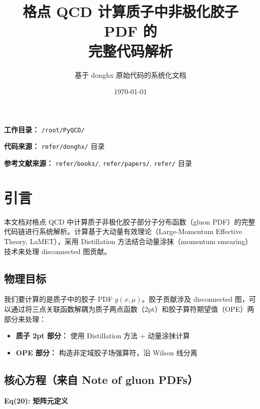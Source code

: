 \documentclass[12pt,a4paper]{ctexart}
\title{\textbf{格点 QCD 计算质子中非极化胶子 PDF 的\\完整代码解析}}
\author{基于 donghx 原始代码的系统化文档}
\date{\today}
\newcommand{\lamet}{LaMET}
\begin{document}
\maketitle
\thispagestyle{empty}

\vspace{2cm}
\begin{center}
\large
\textbf{工作目录：} \texttt{/root/PyQCD/}

\vspace{0.5cm}
\textbf{代码来源：} \texttt{refer/donghx/} 目录

\vspace{0.5cm}
\textbf{参考文献来源：} \texttt{refer/books/}, \texttt{refer/papers/}, \texttt{refer/} 目录
\end{center}

\newpage
\tableofcontents
\newpage

\section{引言}

本文档对格点 QCD 中计算质子非极化胶子部分子分布函数（gluon PDF）的完整代码链进行系统解析。计算基于大动量有效理论（Large-Momentum Effective Theory, \lamet），采用 Distillation 方法结合动量涂抹（momentum smearing）技术来处理 disconnected 图贡献。

\subsection{物理目标}

我们要计算的是质子中的胶子 PDF $g(x,\mu)$。胶子贡献涉及 disconnected 图，可以通过将三点关联函数解耦为质子两点函数（2pt）和胶子算符期望值（OPE）两部分来处理：

\begin{itemize}
    \item \textbf{质子 2pt 部分：} 使用 Distillation 方法 + 动量涂抹计算
    \item \textbf{OPE 部分：} 构造非定域胶子场强算符，沿 Wilson 线分离
\end{itemize}

\subsection{核心方程（来自 Note of gluon PDFs）}

\textbf{Eq(20): 矩阵元定义}
\end{document}
